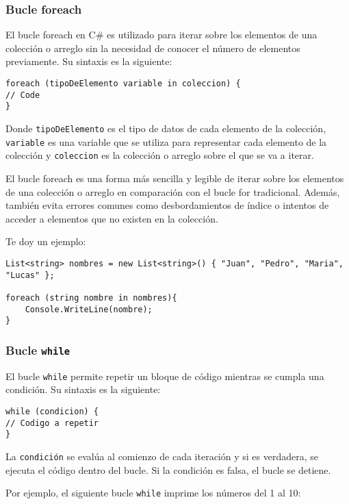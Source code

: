\documentclass[executivepaper]{article}
\begin{document}
\subsubsection*{Bucle foreach}

El bucle foreach en C\# es utilizado para iterar sobre los elementos de una colección o arreglo sin la necesidad de conocer el número de elementos previamente. Su sintaxis es la siguiente:

\begin{lstlisting}
foreach (tipoDeElemento variable in coleccion) {
// Code
}
\end{lstlisting}

Donde \texttt{tipoDeElemento} es el tipo de datos de cada elemento de la colección, \texttt{variable} es una variable que se utiliza para representar cada elemento de la colección y \texttt{coleccion} es la colección o arreglo sobre el que se va a iterar.

El bucle foreach es una forma más sencilla y legible de iterar sobre los elementos de una colección o arreglo en comparación con el bucle for tradicional. Además, también evita errores comunes como desbordamientos de índice o intentos de acceder a elementos que no existen en la colección.

Te doy un ejemplo:
\begin{lstlisting}[language={[Sharp]C}]
List<string> nombres = new List<string>() { "Juan", "Pedro", "Maria", "Lucas" };

foreach (string nombre in nombres){
    Console.WriteLine(nombre);
}
\end{lstlisting}

\subsubsection*{Bucle \texttt{while}}

El bucle \verb|while| permite repetir un bloque de código mientras se cumpla una condición. Su sintaxis es la siguiente:

\begin{lstlisting}
while (condicion) {
// Codigo a repetir
}
\end{lstlisting}

La \texttt{condición} se evalúa al comienzo de cada iteración y si es verdadera, se ejecuta el código dentro del bucle. Si la condición es falsa, el bucle se detiene.

Por ejemplo, el siguiente bucle \verb|while| imprime los números del 1 al 10:
\end{document}

